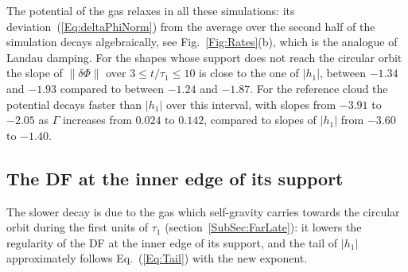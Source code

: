 The potential of the gas relaxes in all these simulations: its deviation~(\ref{Eq:deltaPhiNorm}) from the average over the second half of the simulation decays algebraically, see Fig.~\ref{Fig:Rates}(b), which is the analogue of Landau damping. For the shapes whose support does not reach the circular orbit the slope of $\|\delta\Phi\|$ over $3\leq t/\tau_1\leq 10$ is close to the one of $|h_1|$, between $-1.34$ and $-1.93$ compared to between $-1.24$ and $-1.87$. For the reference cloud the potential decays faster than $|h_1|$ over this interval, with slopes from $-3.91$ to $-2.05$ as $\Gamma$ increases from $0.024$ to $0.142$, compared to slopes of $|h_1|$ from $-3.60$ to $-1.40$.


\subsection{The DF at the inner edge of its support}
\label{SubSec:RatesEdge}

The slower decay is due to the gas which self-gravity carries towards the circular orbit during the first units of $\tau_1$ (section~\ref{SubSec:FarLate}): it lowers the regularity of the DF at the inner edge of its support, and the tail of $|h_1|$ approximately follows Eq.~(\ref{Eq:Tail}) with the new exponent.

